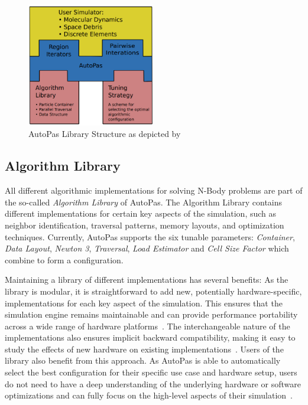 \documentclass[conference]{IEEEtran}
\begin{document}
\begin{figure}[H]
    \centering
    \includegraphics[width=2.2in]{figures/AutoPasLibraryStructure.png}
    \caption{AutoPas Library Structure as depicted by~\cite{Newcome2023Poster}}
    \label{fig_architecture}
\end{figure}

\subsection{Algorithm Library}

All different algorithmic implementations for solving N-Body problems are part of the so-called \textit{Algorithm Library} of AutoPas. The Algorithm Library contains different implementations for certain key aspects of the simulation, such as neighbor identification, traversal patterns, memory layouts, and optimization techniques. Currently, AutoPas supports the six tunable parameters: \textit{Container}, \textit{Data Layout}, \textit{Newton 3}, \textit{Traversal}, \textit{Load Estimator} and \textit{Cell Size Factor} which combine to form a configuration.

Maintaining a library of different implementations has several benefits: As the library is modular, it is straightforward to add new, potentially hardware-specific, implementations for each key aspect of the simulation. This ensures that the simulation engine remains maintainable and can provide performance portability across a wide range of hardware platforms~\cite{Tchipev2020}. The interchangeable nature of the implementations also ensures implicit backward compatibility, making it easy to study the effects of new hardware on existing implementations~\cite{Tchipev2020}. Users of the library also benefit from this approach. As AutoPas is able to automatically select the best configuration for their specific use case and hardware setup, users do not need to have a deep understanding of the underlying hardware or software optimizations and can fully focus on the high-level aspects of their simulation~\cite{Tchipev2020}\cite{Gratl2022AutoPas}.
\end{document}
